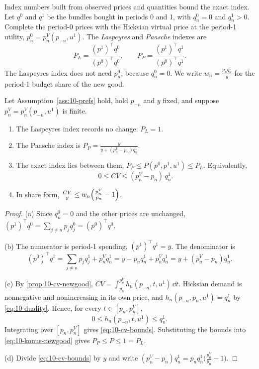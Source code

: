 Index numbers built from observed prices and quantities bound the exact index. Let $q^0$ and $q^1$ be the
bundles bought in periods 0 and 1, with $q_n^0 = 0$ and $q_n^1 > 0$. Complete the period-0 prices with the
Hicksian virtual price at the period-1 utility, $p_n^0 = p_n^V(p_{-n},u^1)$. The \emph{Laspeyres} and
\emph{Paasche} indexes are
\begin{equation}\label{eq:10-LP}
  P_L = \frac{(p^1)^\top q^0}{(p^0)^\top q^0}, \qquad P_P = \frac{(p^1)^\top q^1}{(p^0)^\top q^1}.
\end{equation}
The Laspeyres index does not need $p_n^0$, because $q_n^0 = 0$. We write $w_n = \frac{p_nq_n^1}{y}$ for the
period-1 budget share of the new good.

\begin{proposition}\label{prop:10-index-bounds}
Let Assumption~\ref{ass:10-prefs} hold, hold $p_{-n}$ and $y$ fixed, and suppose $p_n^V = p_n^V(p_{-n},u^1)$ is finite.
\begin{enumerate}[label=(\alph*)]
  \item The Laspeyres index records no change: $P_L = 1$.
  \item The Paasche index is $P_P = \frac{y}{y + (p_n^V - p_n)q_n^1}$.
  \item The exact index lies between them, $P_P \le P(p^0,p^1,u^1) \le P_L$. Equivalently,
  \begin{equation}\label{eq:10-cv-bounds}
    0 \le CV \le (p_n^V - p_n)\,q_n^1 .
  \end{equation}
  \item In share form, $\frac{CV}{y} \le w_n\Bigl(\frac{p_n^V}{p_n} - 1\Bigr)$.
\end{enumerate}
\end{proposition}

\begin{proof}
(a) Since $q_n^0 = 0$ and the other prices are unchanged,
$(p^1)^\top q^0 = \sum_{j\neq n}p_jq_j^0 = (p^0)^\top q^0$.

(b) The numerator is period-1 spending, $(p^1)^\top q^1 = y$. The denominator is
\begin{equation*}
  (p^0)^\top q^1 = \sum_{j\neq n}p_jq_j^1 + p_n^Vq_n^1 = y - p_nq_n^1 + p_n^Vq_n^1 = y + (p_n^V - p_n)q_n^1 .
\end{equation*}

(c) By \cref{prop:10-cv-newgood}, $CV = \int_{p_n}^{p_n^V}h_n(p_{-n},t,u^1)\,\dd t$. Hicksian demand is
nonnegative and nonincreasing in its own price, and $h_n(p_{-n},p_n,u^1) = q_n^1$ by \eqref{eq:10-duality}.
Hence, for every $t \in [p_n,p_n^V]$,
\begin{equation*}
  0 \le h_n(p_{-n},t,u^1) \le q_n^1 .
\end{equation*}
Integrating over $[p_n,p_n^V]$ gives \eqref{eq:10-cv-bounds}. Substituting the bounds into
\eqref{eq:10-konus-newgood} gives $P_P \le P \le 1 = P_L$.

(d) Divide \eqref{eq:10-cv-bounds} by $y$ and write $(p_n^V - p_n)q_n^1 = p_nq_n^1\bigl(\frac{p_n^V}{p_n} - 1\bigr)$.
\end{proof}

